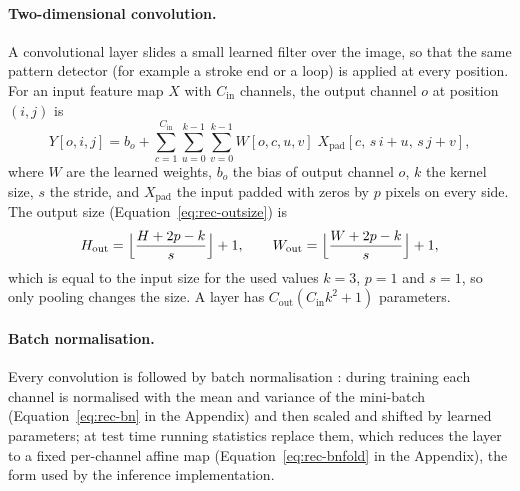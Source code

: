 \paragraph{Two-dimensional convolution.}
A convolutional layer slides a small learned filter over the image, so that the same pattern detector (for example a stroke end or a loop) is applied at every position.
For an input feature map $X$ with $C_{\mathrm{in}}$ channels, the output channel $o$ at position $(i,j)$ is
\begin{equation}
Y[o,i,j]=b_o+\sum_{c=1}^{C_{\mathrm{in}}}\sum_{u=0}^{k-1}\sum_{v=0}^{k-1}W[o,c,u,v]\;X_{\mathrm{pad}}[c,\,s\,i+u,\,s\,j+v],
\label{eq:rec-conv}
\end{equation}
where $W$ are the learned weights, $b_o$ the bias of output channel $o$, $k$ the kernel size, $s$ the stride, and $X_{\mathrm{pad}}$ the input padded with zeros by $p$ pixels on every side.
The output size (Equation~\ref{eq:rec-outsize}) is
\begin{equation}
H_{\mathrm{out}}=\Bigl\lfloor\frac{H+2p-k}{s}\Bigr\rfloor+1,\qquad W_{\mathrm{out}}=\Bigl\lfloor\frac{W+2p-k}{s}\Bigr\rfloor+1,
\label{eq:rec-outsize}
\end{equation}
which is equal to the input size for the used values $k=3$, $p=1$ and $s=1$, so only pooling changes the size.
A layer has $C_{\mathrm{out}}(C_{\mathrm{in}}k^2+1)$ parameters.

\paragraph{Batch normalisation.}
Every convolution is followed by batch normalisation \cite{ioffe2015}: during training each channel is normalised with the mean and variance of the mini-batch (Equation~\ref{eq:rec-bn} in the Appendix) and then scaled and shifted by learned parameters; at test time running statistics replace them, which reduces the layer to a fixed per-channel affine map (Equation~\ref{eq:rec-bnfold} in the Appendix), the form used by the inference implementation.

